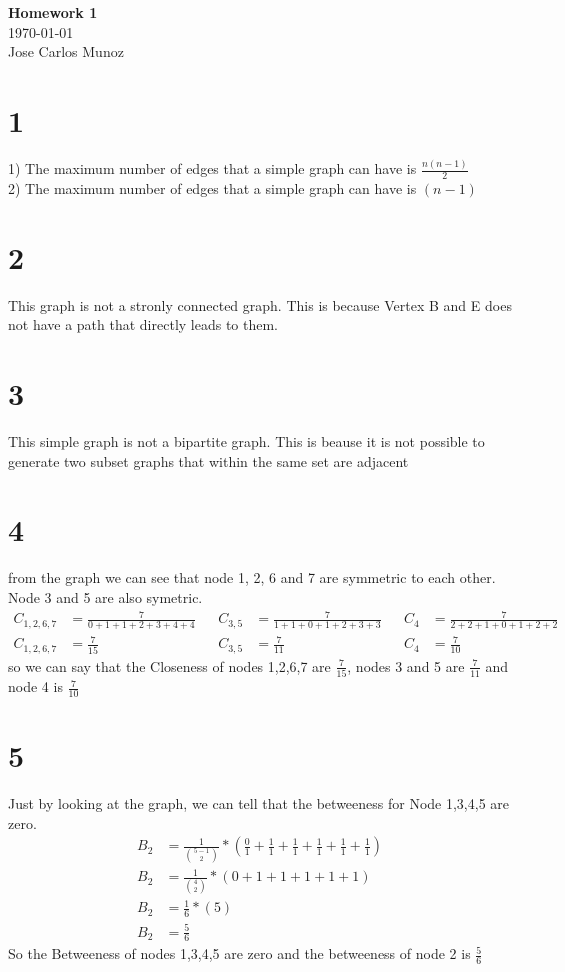\documentclass[12pt,english]{article}
\begin{document}
\begin{center}
    \Large
    \textbf{Homework 1}\\
    \small
    \today\\
    \large
    Jose Carlos Munoz
\end{center}
\section*{1}
1) The maximum number of edges that a simple graph can have is $\frac{n(n-1)}{2}$\\
2) The maximum number of edges that a simple graph can have is $(n-1)$\\
\section*{2}
This graph is not a stronly connected graph. This is because Vertex B and E does not have a path that directly leads to them. 
\section*{3}
This simple graph is not a bipartite graph. This is beause it is not possible to generate two subset graphs that within the same set are adjacent
\section*{4}
from the graph we can see that node 1, 2, 6 and 7 are symmetric to each other. Node 3 and 5 are also symetric.
\begin{align*}
C_{1,2,6,7}& =\frac{7}{0 +1 +1 +2 +3 +4 + 4} & & C_{3,5} & =\frac{7}{1 +1 +0 +1 +2 +3 + 3} & &C_4 & =\frac{7}{2 + 2 + 1 + 0 + 1 + 2 + 2}\\
C_{1,2,6,7}& =\frac{7}{15}                             & & C_{3,5} &=\frac{7}{11}                              & &C_4 & =\frac{7}{10}
\end{align*}
so we can say that the Closeness of nodes 1,2,6,7 are $\frac{7}{15}$, nodes 3 and 5 are $\frac{7}{11}$ and node 4 is $\frac{7}{10}$
\section*{5}
Just by looking at the graph, we can tell that the betweeness for Node 1,3,4,5 are zero.
\begin{align*}
B_{2}& =\frac{1}{{5-1\choose 2}} * (\frac{0}{1}+\frac{1}{1}+\frac{1}{1}+\frac{1}{1}+\frac{1}{1}+\frac{1}{1})\\
B_{2}& =\frac{1}{{4\choose 2}} * (0 + 1+1+1+1+1)\\
B_{2} & =\frac{1}{6} * (5)\\
B_{2} & =\frac{5}{6}
\end{align*}
So the Betweeness of nodes 1,3,4,5 are zero and the betweeness of node 2 is $\frac{5}{6}$
\end{document}
